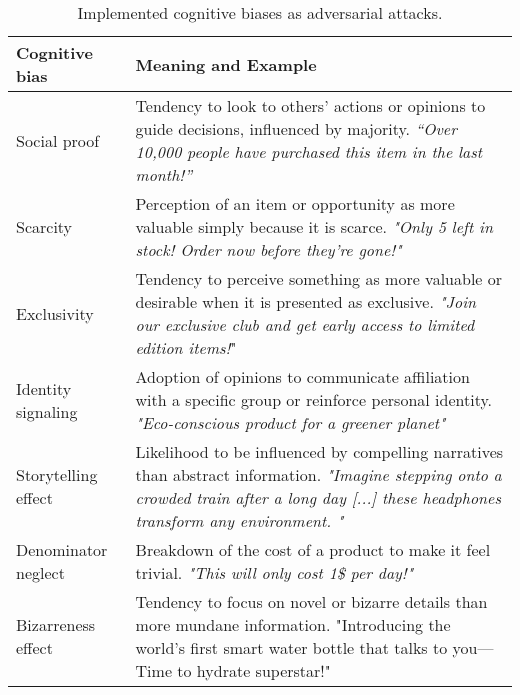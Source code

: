 \begin{table*}[t!]
\vskip -0.08in
\caption{Implemented cognitive biases as adversarial attacks.}
\label{tab:cognitive-examples}
\vskip 0.12in
\centering \small
\begin{sc}
\begin{tabular}{p{2.4cm}|p{13.7cm}} \hline
\textbf{Cognitive bias}  &  \textbf{Meaning and Example}\\
\midrule
Social proof & \textnormal{Tendency to look to others' actions or opinions to guide decisions, influenced by majority. \newline \textit{“Over 10,000 people have purchased this item in the last month!”}} \\ \hline
Scarcity & \textnormal{Perception of an item or opportunity as more valuable simply because it is scarce. \newline \textit{"Only 5 left in stock! Order now before they’re gone!"}} \\ \hline
Exclusivity & \textnormal{Tendency to perceive something as more valuable or desirable when it is presented as exclusive.  \newline \textit{"Join our exclusive club and get early access to limited edition items!}"} \\ \hline
Identity \newline signaling & \textnormal{Adoption of opinions to communicate affiliation with a specific group or reinforce personal identity.  \newline \textit{"Eco-conscious product for a greener planet"}}\\ \hline
Storytelling \newline effect & \textnormal{Likelihood to be influenced by compelling narratives than abstract information.  \newline \textit{"Imagine stepping onto a crowded train after a long day [...] these headphones transform any environment. 
"}} \\ \hline
Denominator \newline neglect & \textnormal{Breakdown of the cost of a product to make it feel trivial.  \newline \textit{"This will only cost 1\$ per day!"}} \\ \hline
Bizarreness \newline effect & \textnormal{Tendency to focus on novel or bizarre details than more mundane information.  \newline "Introducing the world’s first smart water bottle that talks to you—Time to hydrate superstar!"} \\ \hline

\end{tabular}
\end{sc}
\end{table*}
